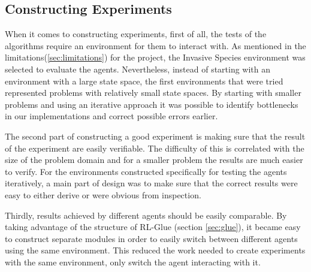 \subsection{Constructing Experiments }
\label{sec:constructing_experiments}
When it comes to constructing experiments, first of all, the tests of the algorithms require an environment for them to interact with. As mentioned in the limitations(\ref{sec:limitations}) for the project, the Invasive Species environment was selected to evaluate the agents. Nevertheless, instead of starting with an environment with a large state space, the first environments that were tried represented problems with relatively small state spaces. By starting with smaller problems and using an iterative approach it was possible to identify  bottlenecks in our implementations and correct possible errors earlier.

The second part of constructing a good experiment is making sure that the result of the experiment are easily verifiable. The difficulty of this is correlated with the size of the problem domain and for a smaller problem the results are much easier to verify. For the environments constructed specifically for testing the agents iteratively, a main part of design was to make sure that the correct results were easy to either derive or were obvious from inspection. 

Thirdly, results achieved by different agents should be easily comparable. By taking advantage of the structure of RL-Glue (section \ref{sec:glue}), it became easy to construct separate modules in order to easily switch between different agents using the same environment. This reduced the work needed to create experiments with the same environment, only switch the agent interacting with it. 